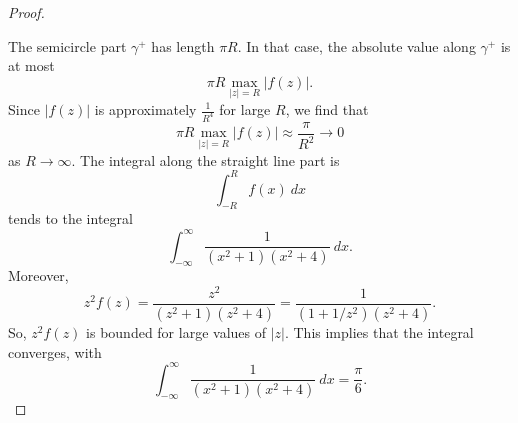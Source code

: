 \documentclass[a4paper, openany]{memoir}
\theoremstyle{definition}
\theoremstyle{plain}
\begin{document}
\begin{proof}
\begin{figure}[H]
    \end{figure}
    \noindent The semicircle part $\gamma^+$ has length $\pi R$. In that case, the absolute value along $\gamma^+$ is at most
    \[\pi R \max_{|z| = R} |f(z)|.\]
    Since $|f(z)|$ is approximately $\frac{1}{R^4}$ for large $R$, we find that 
    \[\pi R \max_{|z| = R} |f(z)| \approx \frac{\pi}{R^2} \to 0\]
    as $R \to \infty$. The integral along the straight line part is
    \[\int_{-R}^R f(x) \ dx\]
    tends to the integral
    \[\int_{-\infty}^\infty \frac{1}{(x^2 + 1)(x^2 + 4)} \ dx.\]
    Moreover, 
    \[z^2 f(z) = \frac{z^2}{(z^2 + 1)(z^2 + 4)} = \frac{1}{(1 + 1/z^2)(z^2 + 4)}.\]
    So, $z^2 f(z)$ is bounded for large values of $|z|$. This implies that the integral converges, with
    \[\int_{-\infty}^\infty \frac{1}{(x^2 + 1)(x^2 + 4)} \ dx = \frac{\pi}{6}.\]
\end{proof}
\end{document}
